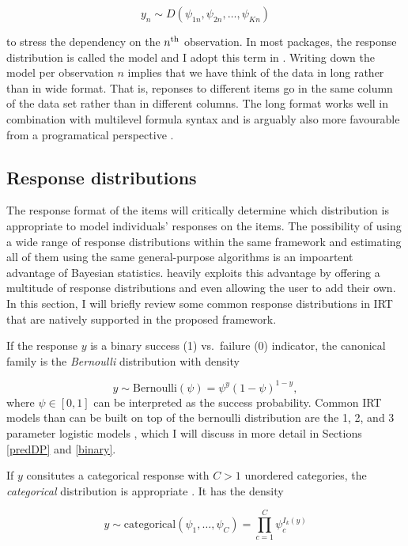 \documentclass[jss]{jss}
\begin{document}
\[
y_n \sim D(\psi_{1n}, \psi_{2n}, \ldots, \psi_{Kn})
\]

to stress the dependency on the \(n\textsuperscript{th}\) observation.
In most  packages, the response distribution is called the
model  and I adopt this term in . Writing down
the model per observation \(n\) implies that we have think of the data
in long rather than in wide format. That is, reponses to different items
go in the same column of the data set rather than in different columns.
The long format works well in combination with multilevel formula syntax
and is arguably also more favourable from a programatical perspective
\citep[e.g., see][]{wickham2016}.

\hypertarget{respdists}{%
\subsection{Response distributions}\label{respdists}}

The response format of the items will critically determine which
distribution is appropriate to model individuals' responses on the
items. The possibility of using a wide range of response distributions
within the same framework and estimating all of them using the same
general-purpose algorithms is an impoartent advantage of Bayesian
statistics.  heavily exploits this advantage by offering a
multitude of response distributions and even allowing the user to add
their own. In this section, I will briefly review some common response
distributions in IRT that are natively supported in the proposed
framework.

If the response \(y\) is a binary success (1) vs.~failure (0) indicator,
the canonical family is the \emph{Bernoulli} distribution with density

\[
y \sim \text{Bernoulli}(\psi) = \psi^y (1-\psi)^{1-y},
\] where \(\psi \in [0, 1]\) can be interpreted as the success
probability. Common IRT models than can be built on top of the bernoulli
distribution are the 1, 2, and 3 parameter logistic models \citep[1PL,
2PL, and 3PL models;][]{agresti2010}, which I will discuss in more
detail in Sections \ref{predDP} and \ref{binary}.

If \(y\) consitutes a categorical response with \(C > 1\) unordered
categories, the \emph{categorical} distribution is appropriate
\citep{agresti2010}. It has the density

\[
y \sim \text{categorical}(\psi_1, \ldots, \psi_C) = \prod_{c = 1}^C \psi_c^{I_k(y)}
\]
\end{document}

